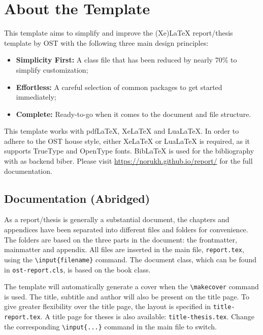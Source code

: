 \chapter{About the Template}

This template aims to simplify and improve the (Xe)LaTeX report/thesis template by OST with the following three main design principles:

\begin{itemize}
  \item \textbf{Simplicity First:} A class file that has been reduced by nearly 70\% to simplify customization;
  \item \textbf{Effortless:} A careful selection of common packages to get started immediately;
  \item \textbf{Complete:} Ready-to-go when it comes to the document and file structure.
\end{itemize}

\noindent This template works with pdfLaTeX, XeLaTeX and LuaLaTeX. In order to adhere to the OST house style, either XeLaTeX or LuaLaTeX is required, as it supports TrueType and OpenType fonts. BibLaTeX is used for the bibliography with as backend biber. Please visit \url{https://norukh.github.io/report/} for the full documentation.

\section*{Documentation (Abridged)}

As a report/thesis is generally a substantial document, the chapters and appendices have been separated into different files and folders for convenience. The folders are based on the three parts in the document: the frontmatter, mainmatter and appendix. All files are inserted in the main file, \texttt{report.tex}, using the \texttt{\textbackslash input\{filename\}} command. The document class, which can be found in \texttt{ost-report.cls}, is based on the book class. 

The template will automatically generate a cover when the \texttt{\textbackslash makecover} command is used. The title, subtitle and author will also be present on the title page. To give greater flexibility over the title page, the layout is specified in \texttt{title-report.tex}. A title page for theses is also available: \texttt{title-thesis.tex}. Change the corresponding \texttt{\textbackslash input\{...\}} command in the main file to switch. 


